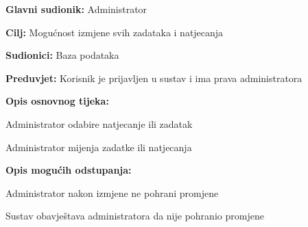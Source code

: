 					\eject
					
					\noindent {}
					\begin{packed_item}
						
						\item \textbf{Glavni sudionik: }Administrator
						\item  \textbf{Cilj:} Mogućnost izmjene svih zadataka i natjecanja 
						\item  \textbf{Sudionici:} Baza podataka
						\item  \textbf{Preduvjet:} Korisnik je prijavljen u sustav i ima prava administratora
						\item  \textbf{Opis osnovnog tijeka:}
						
						\item[] \begin{packed_enum}
							
							\item Administrator odabire natjecanje ili zadatak
							\item Administrator mijenja zadatke ili natjecanja
							
						\end{packed_enum}
						\item  \textbf{Opis mogućih odstupanja:}
						
						\item[] \begin{packed_item}
							
							\item[2.a] Administrator nakon izmjene ne pohrani promjene
							\item[] \begin{packed_enum}
								
								\item Sustav obavještava administratora da nije pohranio promjene
								
							\end{packed_enum}
						\end{packed_item}
					\end{packed_item}
					
